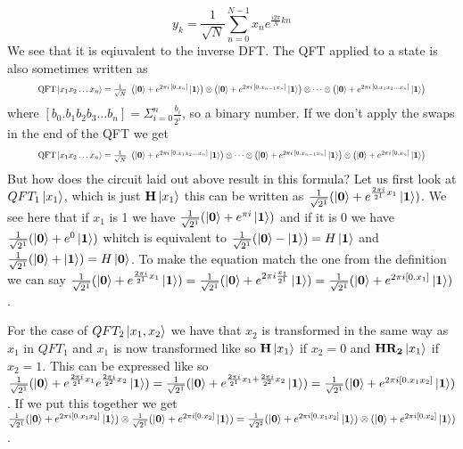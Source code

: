 $$y_{k}={\frac {1}{\sqrt {N}}}\sum _{n=0}^{N-1}x_{n}e^{{\frac {i2\pi }{N}}kn}$$
We see that it is eqiuvalent to the inverse DFT.
The QFT applied to a state is also sometimes written as 
\begin{equation*}
\resizebox{.9\hsize}{!}{${\text{QFT}}\ket{x_{1}x_{2}\ldots x_{n}} ={\frac {1}{\sqrt {N}}}\ \left(\ket{\qtz} +e^{2\pi i\,[0.x_{n}]}\ket{\qto} \right)\otimes \left(\ket{\qtz} +e^{2\pi i\,[0.x_{n-1}x_{n}]}\ket{\qto} \right)\otimes \cdots \otimes \left(\ket{\qtz} +e^{2\pi i\,[0.x_{1}x_{2}\ldots x_{n}]}\ket{\qto} \right)$}
\end{equation*}
where $[b_0.b_1b_2b_3...b_n]=\Sigma^{n}_{i=0}\frac{b_i}{2^i}$, so a binary number\cite{osd}. If we don't apply the swaps in the end of the QFT we get 
\begin{equation*}
    \resizebox{.9\hsize}{!}{${\text{QFT}}\ket{x_{1}x_{2}\ldots x_{n}}={\frac {1}{\sqrt {N}}}\ \left(\ket{\qtz} +e^{2\pi i\,[0.x_{1}x_{2}\ldots x_{n}]}\ket{\qto} \right)\otimes \cdots \otimes \left(\ket{\qtz} +e^{2\pi i\,[0.x_{n-1}x_{n}]}\ket{\qto} \right)\otimes \left(\ket{\qtz} +e^{2\pi i\,[0.x_{n}]}\ket{\qto} \right)$}
\end{equation*}
But how does the circuit laid out above result in this formula?
Let us first look at $QFT_1\ket{x_1}$, which is just $\mathbf{H}\ket{x_1}$ this can be written as $\frac{1}{\sqrt{2^1}}(\ket{\mathbf{0}}+e^{\frac{2\pi i}{2^1}x_1}\ket{\mathbf{1}})$.
We see here that if $x_1$ is 1 we have $\frac{1}{\sqrt{2^1}}(\ket{\mathbf{0}}+e^{\pi i}\ket{\mathbf{1}})$ and if it is 0 we have $\frac{1}{\sqrt{2^1}}(\ket{\mathbf{0}}+e^{0}\ket{\mathbf{1}})$ whitch is equivalent to $\frac{1}{\sqrt{2^1}}(\ket{\mathbf{0}}-\ket{\mathbf{1}})=H\ket{\mathbf{1}}$ and $\frac{1}{\sqrt{2^1}}(\ket{\mathbf{0}}+\ket{\mathbf{1}})=H\ket{\mathbf{0}}$. 
To make the equation match the one from the definition we can say $\frac{1}{\sqrt{2^1}}(\ket{\mathbf{0}}+e^{\frac{2\pi i}{2^1}x_1}\ket{\mathbf{1}})=\frac{1}{\sqrt{2^1}}(\ket{\mathbf{0}}+e^{2\pi i\frac{x_1}{2^1}}\ket{\mathbf{1}})=\frac{1}{\sqrt{2^1}}(\ket{\mathbf{0}}+e^{2\pi i[0.x_1]}\ket{\mathbf{1}})$. 




\vspace{\baselineskip}
\noindent
For the case of $QFT_2\ket{x_1,x_2}$ we have that $x_2$ is transformed in the same way as $x_1$ in $QFT_1$ and $x_1$ is now transformed like so $\mathbf{H}\ket{x_1}$ if $x_2=0$ and $\mathbf{H}\mathbf{R_{2}}\ket{x_1}$ if $x_2=1$. 
This can be expressed like so 
$\frac{1}{\sqrt{2^1}}(\ket{\mathbf{0}}+e^{\frac{2\pi i}{2^1}x_1}e^{\frac{2\pi i}{2^2}x_2}\ket{\mathbf{1}})= \frac{1}{\sqrt{2^1}}(\ket{\mathbf{0}}+e^{\frac{2\pi i}{2^1}x_1+\frac{2\pi i}{2^2}x_2}\ket{\mathbf{1}})=\frac{1}{\sqrt{2^1}}(\ket{\mathbf{0}}+e^{2\pi i[0.x_1x_2]}\ket{\mathbf{1}})$. 
If we put this together we get $\frac{1}{\sqrt{2^1}}(\ket{\mathbf{0}}+e^{2\pi i[0.x_1x_2]}\ket{\mathbf{1}})\otimes \frac{1}{\sqrt{2^1}}(\ket{\mathbf{0}}+e^{2\pi i[0.x_2]}\ket{\mathbf{1}})=\frac{1}{\sqrt{2^2}}(\ket{\mathbf{0}}+e^{2\pi i[0.x_1x_2]}\ket{\mathbf{1}})\otimes(\ket{\mathbf{0}}+e^{2\pi i[0.x_2]}\ket{\mathbf{1}})$. 



